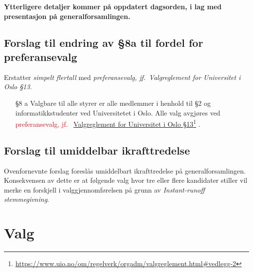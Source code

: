 \documentclass[10pt,norsk,a4paper]{article}
\newcommand\fhref[2]{%
	\href{#1}{#2}\footnote{\url{#1}}%
}
\begin{document}
\textbf{Ytterligere detaljer kommer på oppdatert dagsorden, i lag med presentasjon på generalforsamlingen.}

\subsection{Forslag til endring av §8a til fordel for preferansevalg}

Erstatter \textit{simpelt flertall} med \textit{preferansevalg, jf.~Valgreglement for Universitet i Oslo §13}.

\begin{enumerate}
	\item[§8 a] Valgbare til alle styrer er alle medlemmer i henhold til §2 og informatikkstudenter ved Universitetet i Oslo. Alle valg avgjøres ved \textcolor{red}{preferansevalg, jf.~\fhref{https://www.uio.no/om/regelverk/orgadm/valgreglement.html\#vedlegg-2}{Valgreglement for Universitet i Oslo §13}}.
\end{enumerate}

\subsection{Forslag til umiddelbar ikrafttredelse}

Ovenfornevnte forslag foreslås umiddelbart ikrafttredelse på generalforsamlingen.
Konsekvensen av dette er at følgende valg hvor tre eller flere kandidater stiller vil merke en forskjell i valggjennomførelsen på grunn av \textit{Instant-runoff stemmegivning}.



\section{Valg}
\end{document}
